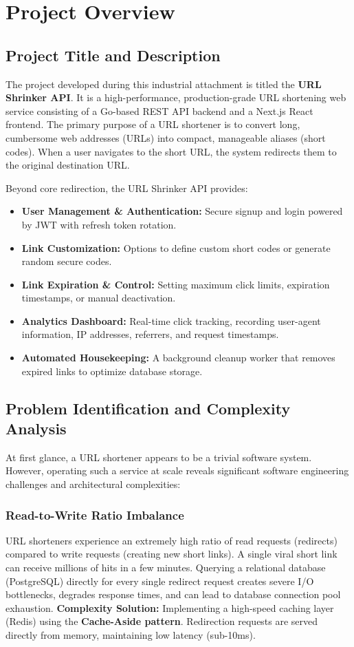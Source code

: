 \chapter{Project Overview}

\section{Project Title and Description}
The project developed during this industrial attachment is titled the \textbf{URL Shrinker API}. It is a high-performance, production-grade URL shortening web service consisting of a Go-based REST API backend and a Next.js React frontend. The primary purpose of a URL shortener is to convert long, cumbersome web addresses (URLs) into compact, manageable aliases (short codes). When a user navigates to the short URL, the system redirects them to the original destination URL. 

Beyond core redirection, the URL Shrinker API provides:
\begin{itemize}
    \item \textbf{User Management \& Authentication:} Secure signup and login powered by JWT with refresh token rotation.
    \item \textbf{Link Customization:} Options to define custom short codes or generate random secure codes.
    \item \textbf{Link Expiration \& Control:} Setting maximum click limits, expiration timestamps, or manual deactivation.
    \item \textbf{Analytics Dashboard:} Real-time click tracking, recording user-agent information, IP addresses, referrers, and request timestamps.
    \item \textbf{Automated Housekeeping:} A background cleanup worker that removes expired links to optimize database storage.
\end{itemize}

\section{Problem Identification and Complexity Analysis}
At first glance, a URL shortener appears to be a trivial software system. However, operating such a service at scale reveals significant software engineering challenges and architectural complexities:

\subsection{Read-to-Write Ratio Imbalance}
URL shorteners experience an extremely high ratio of read requests (redirects) compared to write requests (creating new short links). A single viral short link can receive millions of hits in a few minutes. Querying a relational database (PostgreSQL) directly for every single redirect request creates severe I/O bottlenecks, degrades response times, and can lead to database connection pool exhaustion.
\textbf{Complexity Solution:} Implementing a high-speed caching layer (Redis) using the \textbf{Cache-Aside pattern}. Redirection requests are served directly from memory, maintaining low latency (sub-10ms).

